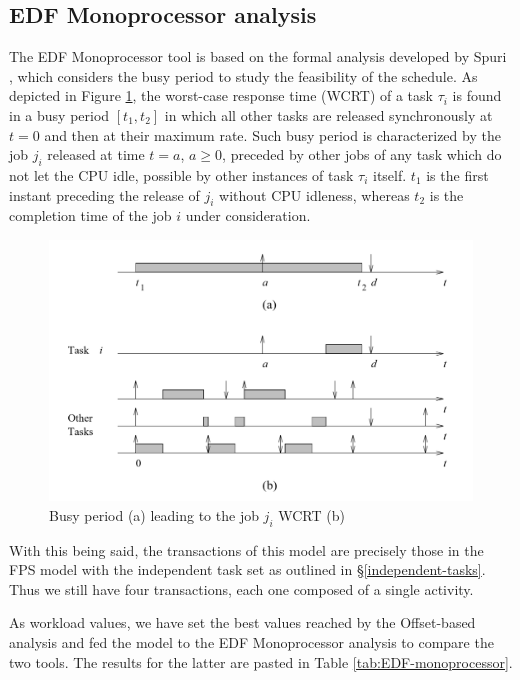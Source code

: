 \documentclass{article}
\begin{document}
\subsection{EDF Monoprocessor analysis}

The EDF Monoprocessor tool is based on the formal analysis developed by Spuri \cite{spuri}, which considers the busy period to study the feasibility of the schedule. As depicted in Figure \ref{fig:spuri}, the worst-case response time (WCRT) of a task $\tau_i$ is found in a busy period $[t_{1},t_{2}]$ in which all other tasks are released synchronously at $t=0$ and then at their maximum rate. Such busy period is characterized by the job $j_i$ released at time $t=a$, $a \ge 0$, preceded by other jobs of any task which do not let the CPU idle, possible by other instances of task $\tau_i$ itself. $t_1$ is the first instant preceding the release of $j_i$ without CPU idleness, whereas $t_{2}$ is the completion time of the job $i$ under consideration.

\begin{figure}[!htbp]
   \centering
   \includegraphics[width=5in]{images/spuri}
   \caption{Busy period (a) leading to the job $j_i$ WCRT (b) \cite{spuri}}
   \label{fig:spuri}
\end{figure}

With this being said, the transactions of this model are precisely those in the FPS model with the independent task set as outlined in §\ref{independent-tasks}. Thus we still have four transactions, each one composed of a single activity.

As workload values, we have set the best values reached by the Offset-based analysis and fed the model to the EDF Monoprocessor analysis to compare the two tools. The results for the latter are pasted in Table \ref{tab:EDF-monoprocessor}.
\end{document}
